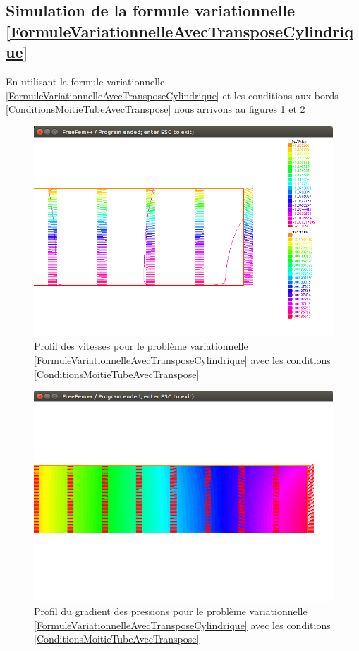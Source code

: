 \documentclass[11pt,a4paper]{article}
\numberwithin{equation}{subsection}
\numberwithin{figure}{subsection}
\begin{document}
\subsection{Simulation de la formule variationnelle \ref{FormuleVariationnelleAvecTransposeCylindrique}}

En utilisant la formule variationnelle \ref{FormuleVariationnelleAvecTransposeCylindrique} et les conditions aux bords \ref{ConditionsMoitieTubeAvecTranspose} nous arrivons au figures \ref{StokesLimitesVitesseCylindrique} et \ref{StokesLimitesPressionCylindrique}

\begin{figure}
\centering
\includegraphics[scale=0.4]{StokesLimitesVitesseCylindrique.png}
\caption{Profil des vitesses pour le problème variationnelle \ref{FormuleVariationnelleAvecTransposeCylindrique} avec les conditions \ref{ConditionsMoitieTubeAvecTranspose}}
\label{StokesLimitesVitesseCylindrique}
\end{figure}

\begin{figure}	
\centering
\includegraphics[scale=0.4]{StokesLimitesPressionCylindrique.png}
\caption{Profil du gradient des pressions pour le problème variationnelle \ref{FormuleVariationnelleAvecTransposeCylindrique} avec les conditions \ref{ConditionsMoitieTubeAvecTranspose}}
\label{StokesLimitesPressionCylindrique}
\end{figure}
\end{document}

